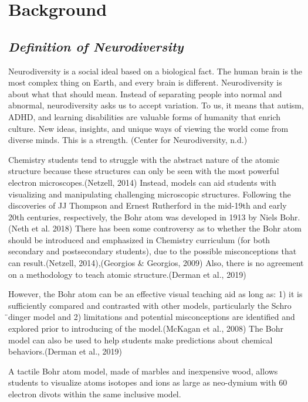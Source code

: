 \documentclass[11pt]{sig-alternate}
\begin{document}
\section*{Background}
\begin{large}
\section*{\textit{Definition of Neurodiversity}}
Neurodiversity is a social ideal based on a biological fact. The human brain is the most complex thing on Earth, and every brain is different. Neurodiversity is about what that should mean. Instead of separating people into normal and abnormal, neurodiversity asks us to accept variation. To us, it means that autism, ADHD, and learning disabilities are valuable forms of humanity that enrich culture. New ideas, insights, and unique ways of viewing the world come from diverse minds. This is a strength.
(Center for Neurodiversity, n.d.)

Chemistry students tend to struggle with the abstract nature of the atomic structure because these structures can only be seen with the most powerful electron microscopes.(Netzell, 2014)  Instead, models can aid students with visualizing and manipulating challenging microscopic structures. Following the discoveries of JJ 
Thompson and Ernest Rutherford in the mid-19th and early 20th centuries, respectively, the Bohr atom was developed in 1913 by Niels Bohr.(Neth et al. 2018) There has been some controversy as to whether the Bohr atom should be introduced and emphasized in Chemistry curriculum (for both secondary and postsecondary students), due to the possible misconceptions that can result.(Netzell, 2014),(Georgios & Georgios, 2009)  Also, there is no agreement on a methodology to teach atomic structure.(Derman et al., 2019)  

However, the Bohr atom can be an effective visual teaching aid as long as: 1) it is sufficiently compared and contrasted with other models, particularly the Schro ̈dinger model and 2) limitations and potential misconceptions are identified and explored prior to introducing of the model.(McKagan et al., 2008) The Bohr model can also be used to help students make predictions about chemical behaviors.(Derman et al., 2019)  

A tactile Bohr atom model, made of marbles and inexpensive wood, allows students to visualize atoms isotopes and ions as large as neo-dymium with 60 electron divots within the same inclusive model. 


\end{large}
\end{document}
